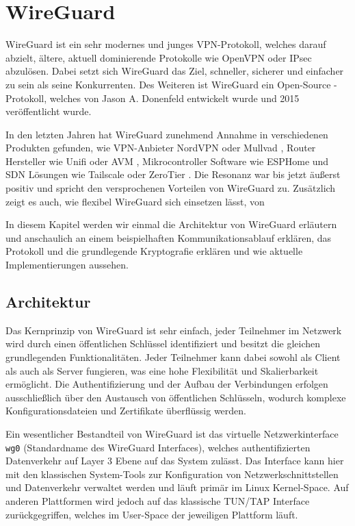 \section{WireGuard} \label{wireguard}

WireGuard ist ein sehr modernes und junges VPN-Protokoll, welches darauf abzielt, ältere, aktuell dominierende Protokolle wie OpenVPN oder IPsec abzulösen. Dabei setzt sich WireGuard das Ziel, schneller, sicherer und einfacher zu sein als seine Konkurrenten. Des Weiteren ist WireGuard ein Open-Source -Protokoll, welches von Jason A. Donenfeld entwickelt wurde und 2015 veröffentlicht wurde. \cite{Wireguard_Whitepaper, Wireguard_Presentations}

In den letzten Jahren hat WireGuard zunehmend Annahme in verschiedenen Produkten gefunden, wie VPN-Anbieter NordVPN \cite{NordLynx} oder Mullvad \cite{Mullvad_Wireguard}, Router Hersteller wie Unifi \cite{Unifi_Wireguard} oder AVM \cite{AVM_Wireguard}, Mikrocontroller Software wie ESPHome \cite{ESPHome_Wireguard} und \acrfull{SDN} Lösungen wie Tailscale \cite{Tailscale} oder ZeroTier \cite{ZeroTier}. Die Resonanz war bis jetzt äußerst positiv und spricht den versprochenen Vorteilen von WireGuard zu. Zusätzlich zeigt es auch, wie flexibel WireGuard sich einsetzen lässt, von 

In diesem Kapitel werden wir einmal die Architektur von WireGuard erläutern und anschaulich an einem beispielhaften Kommunikationsablauf erklären, das Protokoll und die grundlegende Kryptografie erklären und wie aktuelle Implementierungen aussehen.

\subsection{Architektur}

Das Kernprinzip von WireGuard ist sehr einfach, jeder Teilnehmer im Netzwerk wird durch einen öffentlichen Schlüssel identifiziert und besitzt die gleichen grundlegenden Funktionalitäten. Jeder Teilnehmer kann dabei sowohl als Client als auch als Server fungieren, was eine hohe Flexibilität und Skalierbarkeit ermöglicht. Die Authentifizierung und der Aufbau der Verbindungen erfolgen ausschließlich über den Austausch von öffentlichen Schlüsseln, wodurch komplexe Konfigurationsdateien und Zertifikate überflüssig werden.

Ein wesentlicher Bestandteil von WireGuard ist das virtuelle Netzwerkinterface \texttt{wg0} (Standardname des WireGuard Interfaces), welches authentifizierten Datenverkehr auf Layer 3 Ebene auf das System zulässt. Das Interface kann hier mit den klassischen System-Tools zur Konfiguration von Netzwerkschnittstellen und Datenverkehr verwaltet werden und läuft primär im Linux Kernel-Space. Auf anderen Plattformen wird jedoch auf das klassische TUN/TAP Interface zurückgegriffen, welches im User-Space der jeweiligen Plattform läuft. \cite{Wireguard_Whitepaper, Wireguard_cross_platform}

